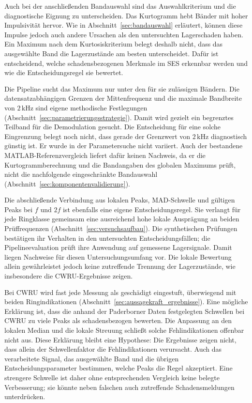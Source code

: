 Auch bei der anschließenden Bandauswahl sind das Auswahlkriterium und die
diagnostische Eignung zu unterscheiden. Das Kurtogramm hebt Bänder mit hoher
Impulsivität hervor. Wie in Abschnitt~\ref{sec:bandauswahl} erläutert,
können diese Impulse jedoch auch andere Ursachen als den untersuchten
Lagerschaden haben. Ein Maximum nach dem Kurtosiskriterium belegt deshalb
nicht, dass das ausgewählte Band die Lagerzustände am besten unterscheidet.
Dafür ist entscheidend, welche schadensbezogenen Merkmale im SES erkennbar
werden und wie die Entscheidungsregel sie bewertet.

Die Pipeline sucht das Maximum nur unter den für sie zulässigen Bändern.
Die datensatzabhängigen Grenzen der Mittenfrequenz und die maximale
Bandbreite von $2\,\mathrm{kHz}$ sind eigene methodische Festlegungen
(Abschnitt~\ref{sec:parametrierungsstrategie}). Damit wird gezielt ein begrenztes
Teilband für die Demodulation gesucht. Die Entscheidung für eine solche
Eingrenzung belegt noch nicht, dass gerade der Grenzwert von
$2\,\mathrm{kHz}$ diagnostisch günstig ist. Er wurde in der
Parametersuche nicht variiert. Auch der bestandene MATLAB-Referenzvergleich
liefert dafür keinen Nachweis, da er die Kurtogrammberechnung und die
Bandangaben des globalen Maximums prüft, nicht die nachfolgende eingeschränkte
Bandauswahl (Abschnitt~\ref{sec:komponentenvalidierung}).

Die abschließende Verbindung aus lokalen Peaks, MAD-Schwelle und gültigen
Peaks bei $f$ und $2f$ ist ebenfalls eine eigene Entscheidungsregel.
Sie verlangt für jede Ringklasse gemeinsam eine ausreichend hohe lokale
Ausprägung an beiden Prüffrequenzen
(Abschnitt~\ref{sec:versuchsaufbau}). Die synthetischen Prüfungen bestätigen ihr
Verhalten in den untersuchten Entscheidungsfällen; die Pipelineevaluation
prüft ihre Anwendung auf gemessene Lagersignale. Damit liegen Nachweise für
diesen Untersuchungsumfang vor. Die lokale Bewertung allein gewährleistet
jedoch keine zutreffende Trennung der Lagerzustände, wie insbesondere die
CWRU-Ergebnisse zeigen.

Bei CWRU wird fast jede Messung als geschädigt eingestuft, überwiegend mit
beiden Ringindikationen (Abschnitt~\ref{sec:aussagekraft_ergebnisse}).
Eine mögliche Erklärung ist, dass die anhand der Paderborner Daten
festgelegten Schwellen bei CWRU zu viele Peaks als schadensbezogen bewerten.
Die Anpassung an den lokalen Median und die lokale Streuung schließt solche
Fehlindikationen offenbar nicht aus. Diese Erklärung bleibt eine Hypothese:
Die Ergebnisse zeigen nicht, dass allein der Schwellenfaktor die
Fehlindikationen verursacht. Auch das verarbeitete Signal, das ausgewählte
Band und die übrigen Entscheidungsparameter bestimmen, welche Peaks die
Regel akzeptiert. Eine strengere Schwelle ist daher ohne entsprechenden
Vergleich keine belegte Verbesserung; sie könnte neben falschen auch
zutreffende Schadensmeldungen unterdrücken.

